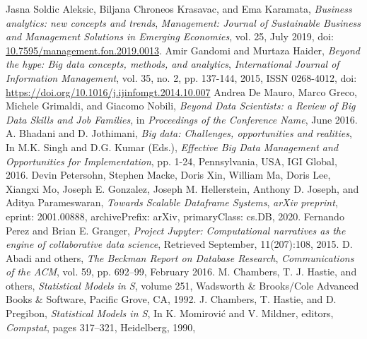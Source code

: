 \documentclass[journal]{IEEEtran} %
\begin{document}
\begin{thebibliography}{00}            
    Jasna Soldic Aleksic, Biljana Chroneos Krasavac, and Ema Karamata,
    \emph{Business analytics: new concepts and trends},
    \emph{Management: Journal of Sustainable Business and Management Solutions in Emerging Economies}, 
    vol. 25, 
    July 2019,
    doi: \url{10.7595/management.fon.2019.0013}.
    Amir Gandomi and Murtaza Haider,
    \emph{Beyond the hype: Big data concepts, methods, and analytics},
    \emph{International Journal of Information Management}, 
    vol. 35, 
    no. 2, 
    pp. 137-144, 
    2015,
    ISSN 0268-4012,
    doi: \url{https://doi.org/10.1016/j.ijinfomgt.2014.10.007}
    Andrea De Mauro, Marco Greco, Michele Grimaldi, and Giacomo Nobili,
    \emph{Beyond Data Scientists: a Review of Big Data Skills and Job Families},
    in \emph{Proceedings of the Conference Name}, %
    June 2016.
    A. Bhadani and D. Jothimani,
    \emph{Big data: Challenges, opportunities and realities},
    In M.K. Singh and D.G. Kumar (Eds.),
    \emph{Effective Big Data Management and Opportunities for Implementation},
    pp. 1-24,
    Pennsylvania, USA,
    IGI Global,
    2016.
    Devin Petersohn, Stephen Macke, Doris Xin, William Ma, Doris Lee, Xiangxi Mo, Joseph E. Gonzalez, Joseph M. Hellerstein, Anthony D. Joseph, and Aditya Parameswaran,
    \emph{Towards Scalable Dataframe Systems},
    \emph{arXiv preprint},
    eprint: 2001.00888,
    archivePrefix: arXiv,
    primaryClass: cs.DB,
    2020.    
    Fernando Perez and Brian E. Granger,
    \emph{Project Jupyter: Computational narratives as the engine of collaborative data science},
    Retrieved September, 11(207):108,
    2015.
    D. Abadi and others,
    \emph{The Beckman Report on Database Research},
    \emph{Communications of the ACM},
    vol. 59,
    pp. 692–99,
    February 2016.
    M. Chambers, T. J. Hastie, and others,
    \emph{Statistical Models in S},
    volume 251,
    Wadsworth \& Brooks/Cole Advanced Books \& Software,
    Pacific Grove, CA,
    1992.
    J. Chambers, T. Hastie, and D. Pregibon,
    \emph{Statistical Models in S},
    In K. Momirović and V. Mildner, editors,
    \emph{Compstat},
    pages 317–321,
    Heidelberg,
    1990,

\end{thebibliography}
\end{document}
